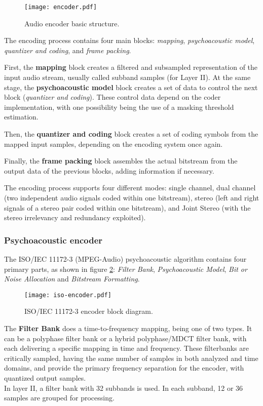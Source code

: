 \begin{figure}[H]
\centerline{\texttt{[image: encoder.pdf]}}
\caption{Audio encoder basic structure.}
\label{fig:encoder}
\end{figure}

The encoding process contains four main blocks: \textit{mapping}, \textit{psychoacoustic model}, \textit{quantizer and coding}, and \textit{frame packing}.

First, the \textbf{mapping} block creates a filtered and subsampled representation of the input audio stream, usually called subband samples (for Layer II). At the same stage, the \textbf{psychoacoustic model} block creates a set of data to control the next block (\textit{quantizer and coding}). These control data depend on the coder implementation, with one possibility being the use of a masking threshold estimation.

Then, the \textbf{quantizer and coding} block creates a set of coding symbols from the mapped input samples, depending on the encoding system once again. 

Finally, the \textbf{frame packing} block assembles the actual bitstream from the output data of the previous blocks, adding information if necessary.

The encoding process supports four different modes: single channel, dual channel (two independent audio signals coded within one bitstream), stereo (left and right signals of a stereo pair coded within one bitstream), and Joint Stereo (with the stereo irrelevancy and redundancy exploited).

\subsubsection{Psychoacoustic encoder}

The ISO/IEC 11172-3 (MPEG-Audio) psychoacoustic algorithm contains four primary parts, as shown in figure \ref{fig:algorithm}: \textit{Filter Bank}, \textit{Psychoacoustic Model}, \textit{Bit or Noise Allocation} and \textit{Bitstream Formatting}.

\begin{figure}[H]
\centerline{\texttt{[image: iso-encoder.pdf]}}
\caption{ISO/IEC 11172-3 encoder block diagram.}
\label{fig:algorithm}
\end{figure}

The \textbf{Filter Bank} does a time-to-frequency mapping, being one of two types. It can be a polyphase filter bank or a hybrid polyphase/MDCT filter bank, with each delivering a specific mapping in time and frequency.
These filterbanks are critically sampled, having the same number of samples in both analyzed and time domains, and provide the primary frequency separation for the encoder, with quantized output samples. \\
In layer II, a filter bank with 32 subbands is used. In each subband, 12 or 36 samples are grouped for processing.


